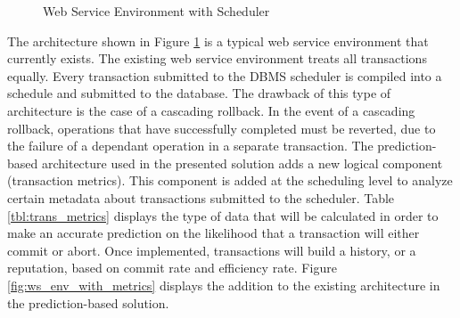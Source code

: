 \begin{figure}[h]
\captionsetup{justification=centering}
\centering %


\caption{Web Service Environment with Scheduler} %
\label{fig:ws_env} %

\end{figure}

The architecture shown in Figure \ref{fig:ws_env} is a typical web service environment that currently exists. The existing web service environment treats all transactions equally. Every transaction submitted to the DBMS scheduler is compiled into a schedule and submitted to the database. The drawback of this type of architecture is the case of a cascading rollback. In the event of a cascading rollback, operations that have successfully completed must be reverted, due to the failure of a dependant operation in a separate transaction. The prediction-based architecture used in the presented solution adds a new logical component (transaction metrics). This component is added at the scheduling level to analyze certain metadata about transactions submitted to the scheduler. Table \ref{tbl:trans_metrics} displays the type of data that will be calculated in order to make an accurate prediction on the likelihood that a transaction will either commit or abort. Once implemented, transactions will build a history, or a reputation, based on commit rate and efficiency rate. Figure \ref{fig:ws_env_with_metrics} displays the addition to the existing architecture in the prediction-based solution.